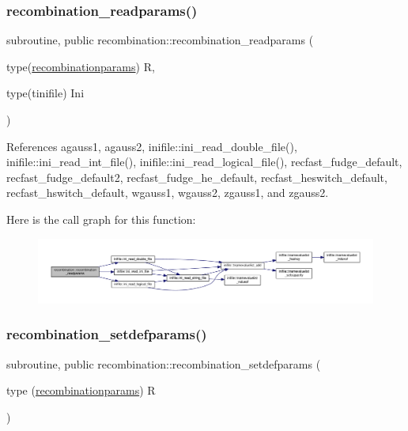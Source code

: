 \subsubsection{\texorpdfstring{recombination\+\_\+readparams()}{recombination\_readparams()}}
{\footnotesize\ttfamily subroutine, public recombination\+::recombination\+\_\+readparams (\begin{DoxyParamCaption}\item[{type(\mbox{\hyperlink{structrecombination_1_1recombinationparams}{recombinationparams}})}]{R,  }\item[{type(tinifile)}]{Ini }\end{DoxyParamCaption})}



References agauss1, agauss2, inifile\+::ini\+\_\+read\+\_\+double\+\_\+file(), inifile\+::ini\+\_\+read\+\_\+int\+\_\+file(), inifile\+::ini\+\_\+read\+\_\+logical\+\_\+file(), recfast\+\_\+fudge\+\_\+default, recfast\+\_\+fudge\+\_\+default2, recfast\+\_\+fudge\+\_\+he\+\_\+default, recfast\+\_\+heswitch\+\_\+default, recfast\+\_\+hswitch\+\_\+default, wgauss1, wgauss2, zgauss1, and zgauss2.

Here is the call graph for this function\+:
\nopagebreak
\begin{figure}[H]
\begin{center}
\leavevmode
\includegraphics[width=350pt]{namespacerecombination_a30d82e415adca06a256aae1be85e72a1_cgraph}
\end{center}
\end{figure}
\mbox{\label{namespacerecombination_aafff8339a994ad18b5b4187d9d4faa40}} 
\subsubsection{\texorpdfstring{recombination\+\_\+setdefparams()}{recombination\_setdefparams()}}
{\footnotesize\ttfamily subroutine, public recombination\+::recombination\+\_\+setdefparams (\begin{DoxyParamCaption}\item[{type (\mbox{\hyperlink{structrecombination_1_1recombinationparams}{recombinationparams}})}]{R }\end{DoxyParamCaption})}



